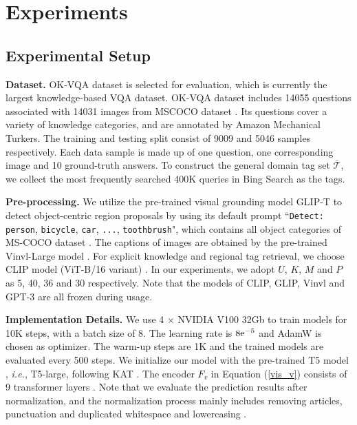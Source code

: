 \documentclass{article}
\begin{document}
\section{Experiments}

\subsection{Experimental Setup}
\label{setup}

\textbf{Dataset. } OK-VQA dataset \cite{marino2019ok} is selected for evaluation, which is currently the largest knowledge-based VQA dataset. OK-VQA dataset includes 14055 questions associated with 14031 images from MSCOCO dataset \cite{lin2014microsoft}. Its questions cover a variety of knowledge categories, and are annotated by Amazon Mechanical Turkers. The training and testing split consist of 9009 and 5046 samples respectively. Each data sample is made up of one question, one corresponding image and 10 ground-truth answers. To construct the general domain tag set $\mathcal{\bar{T}}$, we collect the most frequently searched 400K queries in Bing Search as the tags. 

\textbf{Pre-processing. } We utilize the pre-trained visual grounding model GLIP-T \cite{li2021grounded} to detect object-centric region proposals by using its default prompt ``\texttt{Detect:} \texttt{person}, \texttt{bicycle}, \texttt{car}, \texttt{...}, \texttt{toothbrush}", which contains all object categories of MS-COCO dataset \cite{lin2014microsoft}. The captions of images are obtained by the pre-trained Vinvl-Large model \cite{zhang2021vinvl}. For explicit knowledge and regional tag retrieval, we choose CLIP model (ViT-B/16 variant) \cite{radford2021learning}. In our experiments, we adopt $U$, $K$, $M$ and $P$ as 5, 40, 36 and 30 respectively. Note that the models of CLIP, GLIP, Vinvl and GPT-3 are all frozen during usage.

\textbf{Implementation Details. } We use 4 $\times$ NVIDIA V100 32Gb to train models for 10K steps, with a batch size of 8. The learning rate is $\rm8e^{-5}$ and AdamW \cite{loshchilov2017decoupled} is chosen as optimizer. The warm-up steps are 1K and the trained models are evaluated every 500 steps. We initialize our model with the pre-trained T5 model \cite{raffel2019exploring}, \textit{i.e.}, T5-large, following KAT \cite{gui2021kat}. The encoder $F_{v}$ in Equation (\ref{vis_v}) consists of 9 transformer layers \cite{vaswani2017attention}. Note that we evaluate the prediction results after normalization, and the normalization process mainly includes removing articles, punctuation and duplicated whitespace and lowercasing \cite{chen2017reading, lee2019latent}. 
\end{document}
